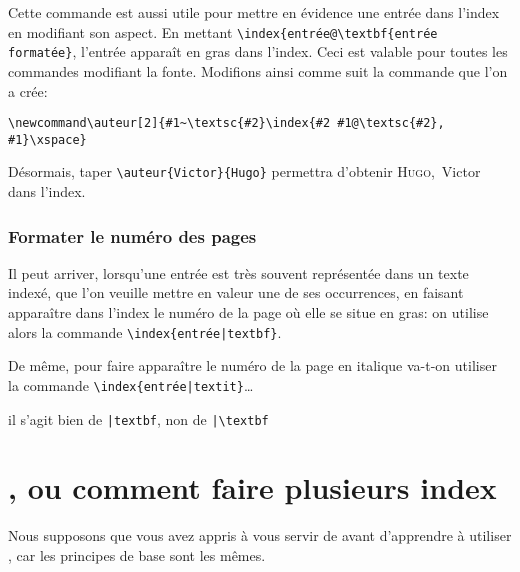 Cette commande est aussi utile pour mettre en évidence une entrée dans l'index en modifiant son aspect. En mettant \verb+\index{entrée@\textbf{entrée formatée}+, l'entrée apparaît en gras dans l'index. Ceci est valable pour toutes les commandes modifiant la fonte. Modifions ainsi comme suit la commande  que l'on a crée:

\begin{verbatim}
\newcommand\auteur[2]{#1~\textsc{#2}\index{#2 #1@\textsc{#2}, #1}\xspace}
\end{verbatim}

Désormais, taper \verb|\auteur{Victor}{Hugo}| permettra d'obtenir \textsc{Hugo},~Victor dans l'index.
 
 
 
\subsubsection{Formater le numéro des pages}

Il peut arriver, lorsqu'une entrée est très souvent représentée dans un texte indexé, que l'on veuille mettre en valeur une de ses occurrences, en faisant apparaître dans l'index le numéro de la page où elle se situe en gras: on utilise alors la commande \verb+\index{entrée|textbf}+. 

De même, pour faire apparaître le numéro de la page en italique va-t-on utiliser la commande \verb+\index{entrée|textit}+…

\begin{attention}
il s'agit bien de \verb+|textbf+, non de \verb+|\textbf+

\end{attention}






\section{, ou comment faire plusieurs index}

\begin{prealable}
Nous supposons que vous avez appris à vous servir de  avant d'apprendre à utiliser , car les principes de base sont les mêmes.
\end{prealable}


